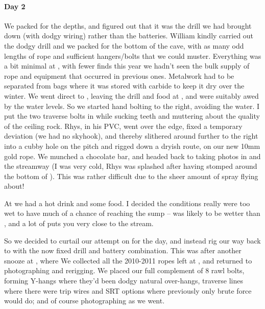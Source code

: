 \paragraph{Day 2}
We packed for the depths, and figured out that it was the drill we had brought down (with dodgy wiring) rather than the batteries. William kindly carried out the dodgy drill and we packed for the bottom of the cave, with as many odd lengths of rope and sufficient hangers/bolts that we could muster. Everything was a bit minimal at , with fewer finds this year we hadn't seen the bulk supply of rope and equipment that occurred in previous ones. Metalwork had to be separated from bags where it was stored with carbide to keep it dry over the winter.
We went direct to , leaving the drill and food at , and were suitably awed by the water levels. 
So we started hand bolting to the right, avoiding the water. I put the two traverse bolts in while sucking teeth and muttering about the quality of the ceiling rock. Rhys, in his PVC, went over the edge, fixed a temporary deviation (we had no skyhook), and thereby slithered around further to the right into a cubby hole on the pitch and rigged down a dryish route, on our new 10mm gold rope. We munched a chocolate bar, and headed back to  taking photos in  and the streamway (I was very cold, Rhys was splashed after having stomped around the bottom of ). This was rather difficult due to the sheer amount of spray flying about!

At  we had a hot drink and some food. I decided the conditions really were too wet to have much of a chance of reaching the sump --  was likely to be wetter than , and a lot of  puts you very close to the stream.

So we decided to curtail our attempt on  for the day, and instead rig our way back to  with the now fixed drill and battery combination. This was after another snooze at , where 
We collected all the 2010-2011 ropes left at , and returned to  photographing and rerigging. We placed our full complement of 8 rawl bolts, forming Y-hangs where they'd been dodgy natural over-hangs, traverse lines where there were trip wires and SRT options where previously only brute force would do; and of course photographing as we went.


